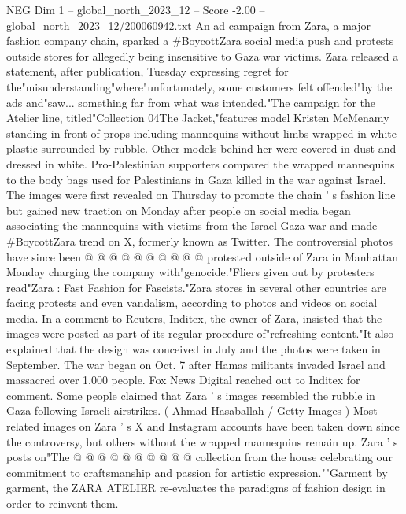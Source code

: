 \begin{textsample}{NEG Dim 1 – global\_north\_2023\_12 – Score -2.00 – global\_north\_2023\_12/200060942.txt}  \label{ex:f1_neg_359}
An ad campaign from Zara, a major fashion company chain, sparked a \#BoycottZara social media push and protests outside stores for allegedly being insensitive to Gaza war victims.
Zara released a statement, after publication, Tuesday expressing regret for the"misunderstanding"where"unfortunately, some customers felt offended"by the ads and"saw... something far from what was intended."The campaign for the Atelier line, titled"Collection 04The Jacket,"features model Kristen McMenamy standing in front of props including mannequins without limbs wrapped in white plastic surrounded by rubble.
Other models behind her were covered in dust and dressed in white.
Pro-Palestinian supporters compared the wrapped mannequins to the body bags used for Palestinians in Gaza killed in the war against Israel.
The images were first revealed on Thursday to promote the chain ' s fashion line but gained new traction on Monday after people on social media began associating the mannequins with victims from the Israel-Gaza war and made \#BoycottZara trend on X, formerly known as Twitter.
The controversial photos have since been @ @ @ @ @ @ @ @ @ @ protested outside of Zara in Manhattan Monday charging the company with"genocide."Fliers given out by protesters read"Zara : Fast Fashion for Fascists."Zara stores in several other countries are facing protests and even vandalism, according to photos and videos on social media.
In a comment to Reuters, Inditex, the owner of Zara, insisted that the images were posted as part of its regular procedure of"refreshing content."It also explained that the design was conceived in July and the photos were taken in September.
The war began on Oct. 7 after Hamas militants invaded Israel and massacred over 1,000 people.
Fox News Digital reached out to Inditex for comment.
Some people claimed that Zara ' s images resembled the rubble in Gaza following Israeli airstrikes. ( Ahmad Hasaballah / Getty Images ) Most related images on Zara ' s X and Instagram accounts have been taken down since the controversy, but others without the wrapped mannequins remain up.
Zara ' s posts on"The @ @ @ @ @ @ @ @ @ @ collection from the house celebrating our commitment to craftsmanship and passion for artistic expression.""Garment by garment, the ZARA ATELIER re-evaluates the paradigms of fashion design in order to reinvent them.

\end{textsample}

